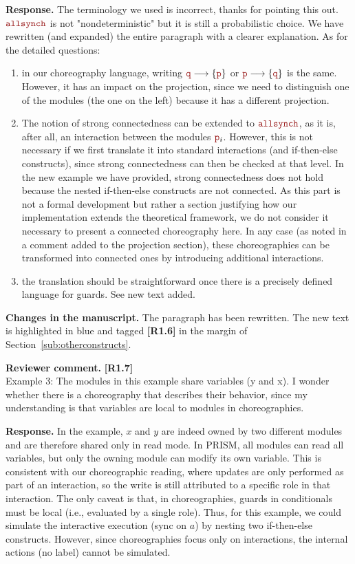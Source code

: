 \documentclass[11pt]{article}
\newcommand{\role}[1]{\textcolor{bloodyred}{\mathtt{#1}}}
\newcommand{\nr}{\role p}
\newcommand{\nrr}{\role q}
\newcommand{\allsynchName}{\textcolor{bloodyred}{\mathtt{allsynch}}}
\newcommand{\revcomment}[1]{%
  \begin{reviewercomment}
  \textbf{Reviewer comment.} #1
  \end{reviewercomment}
}
\newcommand{\revresponse}[2][]{%
  \par\noindent\textbf{Response.} #1 #2
}
\newcommand{\revchanges}[2][]{%
  \par\noindent\textbf{Changes in the manuscript.} #1
  #2\par\bigskip
}
\begin{document}
\revresponse{The terminology we used is incorrect, thanks for pointing
  this out.  $\allsynchName$ is not "nondeterministic" but it is still
  a probabilistic choice. We have rewritten (and expanded) the entire
  paragraph with a clearer explanation. As for the detailed questions:
  \begin{enumerate}
    
  \item in our choreography language, writing
    $\nrr\longrightarrow\{\nr\}$ or $\nr\longrightarrow\{\nrr\}$ is
    the same. However, it has an impact on the projection, since we
    need to distinguish one of the modules (the one on the left)
    because it has a different projection.
    
  \item The notion of strong connectedness can be extended to
    $\allsynchName$, as it is, after all, an interaction between the
    modules $\nr_i$. However, this is not necessary if we first
    translate it into standard interactions (and if-then-else
    constructs), since strong connectedness can then be checked at
    that level. In the new example we have provided, strong
    connectedness does not hold because the nested if-then-else
    constructs are not connected. As this part is not a formal
    development but rather a section justifying how our implementation
    extends the theoretical framework, we do not consider it necessary
    to present a connected choreography here. In any case (as noted in
    a comment added to the projection section), these choreographies
    can be transformed into connected ones by introducing additional
    interactions.

    
  \item the translation should be straightforward once there is a
    precisely defined language for guards. See new text added. 
 \end{enumerate}
}

\revchanges{ The paragraph has been rewritten. The new text is
  highlighted in blue and tagged \textbf{[R1.6]} in the margin of
  Section~\ref{sub:otherconstructs}.}


\revcomment{\textbf{[R1.7]}\\
Example 3: The modules in this example share variables (y and x). I
wonder whether there is a choreography that describes their
behavior, since my understanding is that variables are local to
modules in choreographies.
}

\revresponse{
In the example, $x$ and $y$ are indeed owned by two different modules and are therefore shared only in read mode. In PRISM, all modules can read all variables, but only the owning module can modify its own variable. This is consistent with our choreographic reading, where updates are only performed as part of an interaction, so the write is still attributed to a specific role in that interaction. The only caveat is that, in choreographies, guards in conditionals must be local (i.e., evaluated by a single role). Thus, for this example, we could simulate the interactive execution (sync on $a$) by nesting two if-then-else constructs. However, since choreographies focus only on interactions, the internal actions (no label) cannot be simulated.
}
\end{document}
